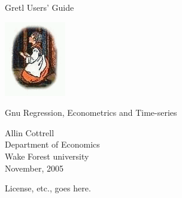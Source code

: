 \documentclass{report}
\begin{document}
\VerbatimFootnotes

\setlength{\parindent}{0pt}
\setlength{\parskip}{1ex}

\newcommand{\gtitle}[1]{\vspace*{1in}
   {\Huge \sffamily #1}\par
   \vspace{.5in}
  \includegraphics{figures/gretl-logo} 
}

\newcommand{\gsubtitle}[1]{%
   {\Large \sffamily #1}
   \vspace{.5in}
}


\thispagestyle{empty}

\begin{center}
\label{titlepage}

\gtitle{Gretl Users' Guide}

\gsubtitle{Gnu Regression, Econometrics and Time-series}

{\large \sffamily 
Allin Cottrell\\
Department of Economics\\
Wake Forest university\\
\vspace{20pt}
November, 2005}

\end{center}
\clearpage



\thispagestyle{empty}

\begin{center}
\label{license}

License, etc., goes here.

\end{center}
\clearpage



\tableofcontents

\clearpage
{}


















\appendix


\end{document}
